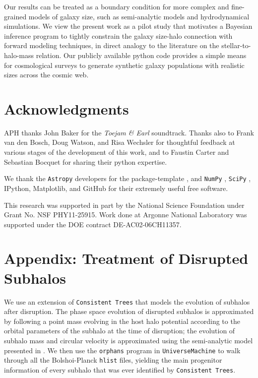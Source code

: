 \documentclass[usenatbib,usegraphicx,letterpaper]{mn2e}
\begin{document}
Our results can be treated as a boundary condition for more complex and fine-grained models of galaxy size, such as semi-analytic models and hydrodynamical simulations. We view the present work as a pilot study that motivates a Bayesian inference program to tightly constrain the galaxy size-halo connection with forward modeling techniques, in direct analogy to the literature on the stellar-to-halo-mass relation. Our publicly available python code provides a simple means for cosmological surveys to generate synthetic galaxy populations with realistic sizes across the cosmic web.

\section*{Acknowledgments}

APH thanks John Baker for the {\em Toejam \& Earl} soundtrack. Thanks also to Frank van den Bosch, Doug Watson, and Risa Wechsler for thoughtful feedback at various stages of the development of this work, and to Faustin Carter and Sebastian Bocquet for sharing their python expertise.

We thank the {\tt Astropy} developers for the package-template \citep{astropy}, and {\tt NumPy} \citep{numpy_ndarray}, {\tt SciPy} \citep{scipy}, IPython, Matplotlib, and GitHub for their extremely useful free software.

This research was supported in part by the National Science Foundation under Grant No. NSF PHY11-25915. Work done at Argonne National Laboratory was supported under the DOE contract DE-AC02-06CH11357.



\section*{Appendix: Treatment of Disrupted Subhalos}

We use an extension of {\tt Consistent Trees} that models the evolution of subhalos after disruption. The phase space evolution of disrupted subhalos is approximated by following a point mass evolving in the host halo potential according to the orbital parameters of the subhalo at the time of disruption; the evolution of subhalo mass and circular velocity is approximated using the semi-analytic model presented in \citet{jiang_vdB14}. We then use the {\tt orphans} program in {\tt UniverseMachine} to walk through all the Bolshoi-Planck {\tt hlist} files, yielding the main progenitor information of every subhalo that was ever identified by {\tt Consistent Trees}.
\end{document}
